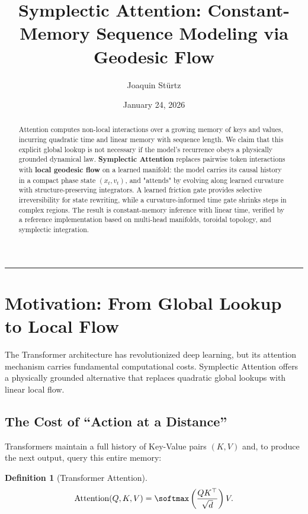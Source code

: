 \documentclass[12pt,letterpaper,twoside]{article}
\title{\textbf{Symplectic Attention: Constant-Memory Sequence Modeling via Geodesic Flow}}
\author{Joaquin Stürtz}
\date{January 24, 2026}
\newtheorem{definition}{Definition}[section]
\begin{document}
\maketitle
\thispagestyle{empty}

\vspace{0.5cm}

\begin{abstract}
Attention computes non-local interactions over a growing memory of keys and values, incurring quadratic time and linear memory with sequence length. We claim that this explicit global lookup is not necessary if the model's recurrence obeys a physically grounded dynamical law. \textbf{Symplectic Attention} replaces pairwise token interactions with \textbf{local geodesic flow} on a learned manifold: the model carries its causal history in a compact phase state $(x_t, v_t)$, and "attends" by evolving along learned curvature with structure-preserving integrators. A learned friction gate provides selective irreversibility for state rewriting, while a curvature-informed time gate shrinks steps in complex regions. The result is constant-memory inference with linear time, verified by a reference implementation based on multi-head manifolds, toroidal topology, and symplectic integration.
\end{abstract}

\vspace{0.5cm}
\hrule
\vspace{0.5cm}

\tableofcontents
\newpage

\section{Motivation: From Global Lookup to Local Flow}

The Transformer architecture has revolutionized deep learning, but its attention mechanism carries fundamental computational costs. Symplectic Attention offers a physically grounded alternative that replaces quadratic global lookups with linear local flow.

\subsection{The Cost of ``Action at a Distance''}

Transformers maintain a full history of Key-Value pairs $(K, V)$ and, to produce the next output, query this entire memory:

\begin{definition}[Transformer Attention]
\[
\text{Attention}(Q, K, V) = \softmax\left(\frac{QK^\top}{\sqrt{d}}\right) V.
\]
\end{definition}
\end{document}
